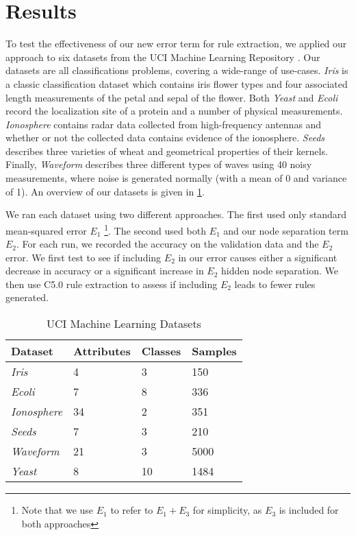 \section{Results}
\label{sec:results}

To test the effectiveness of our new error term for rule extraction,
we applied our approach to six 
datasets from the UCI Machine Learning Repository \cite{uci}. Our
datasets are all classifications problems, covering a wide-range of
use-cases. \textit{Iris} is a classic classification dataset which
contains iris flower types and four associated length
measurements of the petal and sepal of the flower.
Both \textit{Yeast} and \textit{Ecoli}
record the localization site of a protein and a number of
physical measurements. \textit{Ionosphere} contains radar data collected
from high-frequency antennas and whether or not the collected data
contains evidence of the ionosphere. \textit{Seeds} describes three
varieties of wheat and geometrical properties of their kernels.
Finally, \textit{Waveform} describes three different types of waves
using 40 noisy measurements, where noise is generated normally
(with a mean of 0 and variance of 1).
An overview of our datasets is given in \ref{tab:datasets}.

We ran each dataset using two different approaches. The first
used only standard mean-squared error $E_1$
\footnote{Note that we use $E_1$ to refer to $E_1+E_3$ for simplicity, as
$E_3$ is included for both approaches}. The second used both
$E_1$ and our node separation term $E_2$. For each run, we recorded
the accuracy on the validation data and the $E_2$ error.
We first test to see if including $E_2$ in our error causes either
a significant decrease in accuracy or a significant increase
in $E_2$ hidden node separation. We then use C5.0 rule extraction
to assess if including $E_2$ leads to fewer rules generated.

\begin{table}[]
  \centering
\begin{tabular}{@{}llll@{}}
\toprule
Dataset             & Attributes & Classes & Samples \\ \midrule
\textit{Iris}       & 4          & 3       & 150     \\
\textit{Ecoli}      & 7          & 8       & 336     \\
\textit{Ionosphere} & 34         & 2       & 351     \\
\textit{Seeds}      & 7          & 3       & 210     \\
\textit{Waveform}   & 21         & 3       & 5000    \\ 
\textit{Yeast}      & 8          & 10      & 1484    \\ \bottomrule
\end{tabular}
\caption{UCI Machine Learning Datasets}
\label{tab:datasets}
\end{table}

